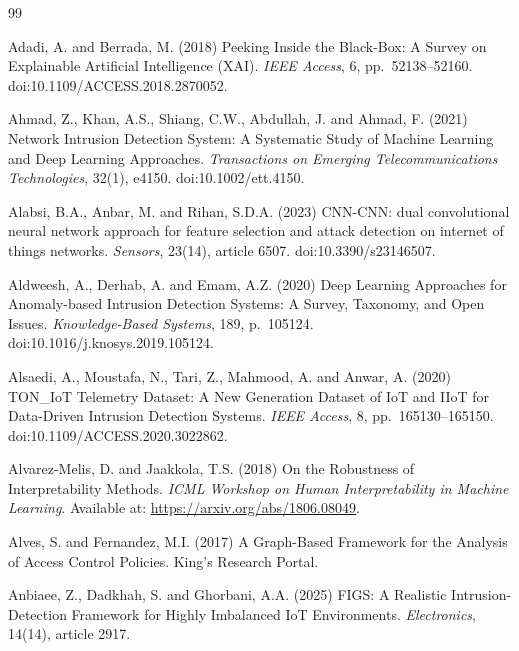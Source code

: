 \documentclass[12pt,a4paper]{report}
\begin{document}

\begin{thebibliography}{99}

Adadi, A. and Berrada, M. (2018) Peeking Inside the Black-Box: A Survey on Explainable Artificial Intelligence (XAI). \textit{IEEE Access}, 6, pp.~52138--52160. doi:10.1109/ACCESS.2018.2870052.

Ahmad, Z., Khan, A.S., Shiang, C.W., Abdullah, J. and Ahmad, F. (2021) Network Intrusion Detection System: A Systematic Study of Machine Learning and Deep Learning Approaches. \textit{Transactions on Emerging Telecommunications Technologies}, 32(1), e4150. doi:10.1002/ett.4150.

Alabsi, B.A., Anbar, M. and Rihan, S.D.A. (2023) CNN-CNN: dual convolutional neural network approach for feature selection and attack detection on internet of things networks. \textit{Sensors}, 23(14), article 6507. doi:10.3390/s23146507.

Aldweesh, A., Derhab, A. and Emam, A.Z. (2020) Deep Learning Approaches for Anomaly-based Intrusion Detection Systems: A Survey, Taxonomy, and Open Issues. \textit{Knowledge-Based Systems}, 189, p.~105124. doi:10.1016/j.knosys.2019.105124.

Alsaedi, A., Moustafa, N., Tari, Z., Mahmood, A. and Anwar, A. (2020) TON\_IoT Telemetry Dataset: A New Generation Dataset of IoT and IIoT for Data-Driven Intrusion Detection Systems. \textit{IEEE Access}, 8, pp.~165130--165150. doi:10.1109/ACCESS.2020.3022862.

Alvarez-Melis, D. and Jaakkola, T.S. (2018) On the Robustness of Interpretability Methods. \textit{ICML Workshop on Human Interpretability in Machine Learning}. Available at: \url{https://arxiv.org/abs/1806.08049}.

Alves, S. and Fernandez, M.I. (2017) A Graph-Based Framework for the Analysis of Access Control Policies. King's Research Portal.

Anbiaee, Z., Dadkhah, S. and Ghorbani, A.A. (2025) FIGS: A Realistic Intrusion-Detection Framework for Highly Imbalanced IoT Environments. \textit{Electronics}, 14(14), article 2917.


\end{thebibliography}
\end{document}
